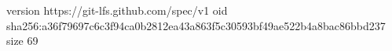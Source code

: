 version https://git-lfs.github.com/spec/v1
oid sha256:a36f79697c6c3f94ca0b2812ea43a863f5c30593bf49ae522b4a8bac86bbd237
size 69
